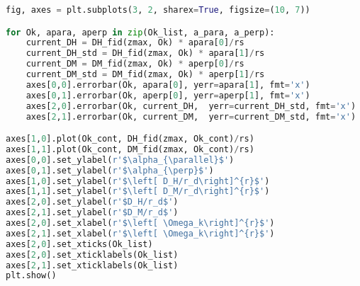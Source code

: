 \begin{lstlisting}[language=python]
fig, axes = plt.subplots(3, 2, sharex=True, figsize=(10, 7))

for Ok, apara, aperp in zip(Ok_list, a_para, a_perp):
    current_DH = DH_fid(zmax, Ok) * apara[0]/rs
    current_DH_std = DH_fid(zmax, Ok) * apara[1]/rs
    current_DM = DM_fid(zmax, Ok) * aperp[0]/rs
    current_DM_std = DM_fid(zmax, Ok) * aperp[1]/rs
    axes[0,0].errorbar(Ok, apara[0], yerr=apara[1], fmt='x')
    axes[0,1].errorbar(Ok, aperp[0], yerr=aperp[1], fmt='x')
    axes[2,0].errorbar(Ok, current_DH,  yerr=current_DH_std, fmt='x') 
    axes[2,1].errorbar(Ok, current_DM,  yerr=current_DM_std, fmt='x') 

axes[1,0].plot(Ok_cont, DH_fid(zmax, Ok_cont)/rs) 
axes[1,1].plot(Ok_cont, DM_fid(zmax, Ok_cont)/rs)
axes[0,0].set_ylabel(r'$\alpha_{\parallel}$')
axes[0,1].set_ylabel(r'$\alpha_{\perp}$')
axes[1,0].set_ylabel(r'$\left[ D_H/r_d\right]^{r}$')
axes[1,1].set_ylabel(r'$\left[ D_M/r_d\right]^{r}$')
axes[2,0].set_ylabel(r'$D_H/r_d$')
axes[2,1].set_ylabel(r'$D_M/r_d$')
axes[2,0].set_xlabel(r'$\left[ \Omega_k\right]^{r}$')
axes[2,1].set_xlabel(r'$\left[ \Omega_k\right]^{r}$')
axes[2,0].set_xticks(Ok_list)
axes[2,0].set_xticklabels(Ok_list)
axes[2,1].set_xticklabels(Ok_list)
plt.show()
\end{lstlisting}
\renewcommand{\baselinestretch}{1.5}



